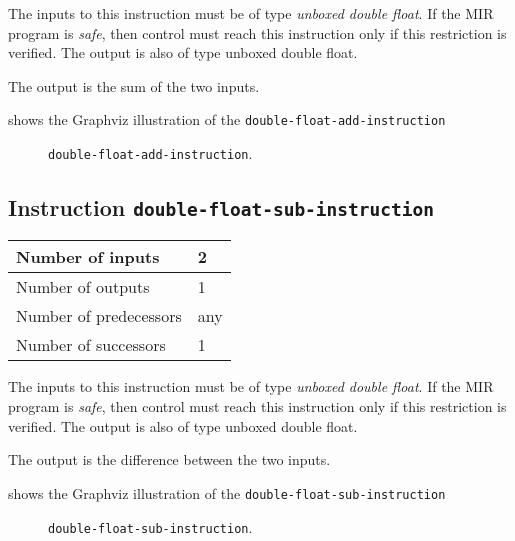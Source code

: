 The inputs to this instruction must be of type \emph{unboxed double
  float}.  If the MIR program is \emph{safe}, then control must reach
this instruction only if this restriction is verified.  The output is
also of type unboxed double float.

The output is the sum of the two inputs.

 shows the Graphviz illustration of the
\texttt{double-float-add-instruction}

\begin{figure}
\begin{center}
\end{center}
\caption{\label{fig-double-float-add-instruction}
\texttt{double-float-add-instruction}.}
\end{figure}

\subsection{Instruction \texttt{double-float-sub-instruction}}
\label{mir-instruction-double-float-sub}

\begin{tabular}{|l|l|}
\hline
Number of inputs & 2\\
\hline
Number of outputs & 1\\
\hline
Number of predecessors & any\\
\hline
Number of successors & 1\\
\hline
\end{tabular}

The inputs to this instruction must be of type \emph{unboxed double
  float}.  If the MIR program is \emph{safe}, then control must reach
this instruction only if this restriction is verified.  The output is
also of type unboxed double float.

The output is the difference between the two inputs.

 shows the Graphviz illustration of the
\texttt{double-float-sub-instruction}

\begin{figure}
\begin{center}
\end{center}
\caption{\label{fig-double-float-sub-instruction}
\texttt{double-float-sub-instruction}.}
\end{figure}

